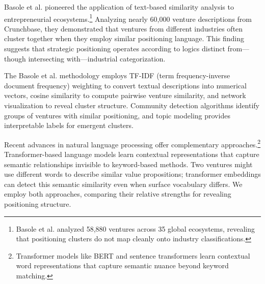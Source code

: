 \documentclass[../main.tex]{subfiles}
\begin{document}
Basole et al. \cite{basole2019visual} pioneered the application of text-based similarity analysis to entrepreneurial ecosystems.\footnote{Basole et al. \cite{basole2019visual} analyzed 58,880 ventures across 35 global ecosystems, revealing that positioning clusters do not map cleanly onto industry classifications.} Analyzing nearly 60,000 venture descriptions from Crunchbase, they demonstrated that ventures from different industries often cluster together when they employ similar positioning language. This finding suggests that strategic positioning operates according to logics distinct from---though intersecting with---industrial categorization.

The Basole et al. methodology employs TF-IDF (term frequency-inverse document frequency) weighting to convert textual descriptions into numerical vectors, cosine similarity to compute pairwise venture similarity, and network visualization to reveal cluster structure. Community detection algorithms identify groups of ventures with similar positioning, and topic modeling provides interpretable labels for emergent clusters.

Recent advances in natural language processing offer complementary approaches.\footnote{Transformer models like BERT \cite{devlin2019bert} and sentence transformers \cite{reimers2019sentence} learn contextual word representations that capture semantic nuance beyond keyword matching.} Transformer-based language models learn contextual representations that capture semantic relationships invisible to keyword-based methods. Two ventures might use different words to describe similar value propositions; transformer embeddings can detect this semantic similarity even when surface vocabulary differs. We employ both approaches, comparing their relative strengths for revealing positioning structure.
\end{document}
